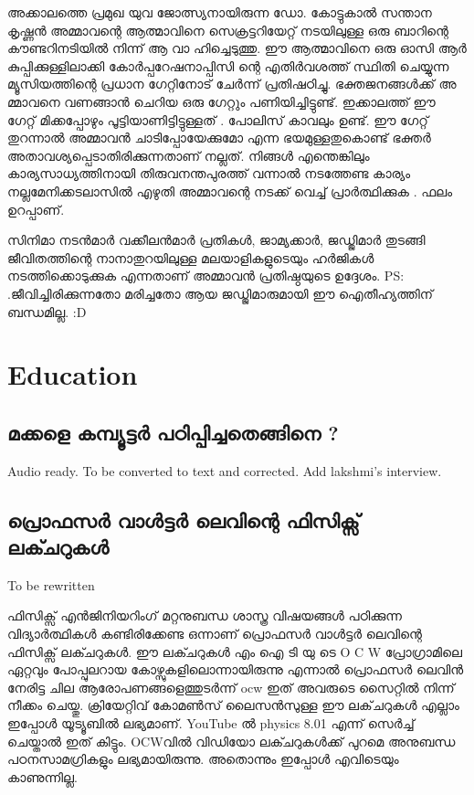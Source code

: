 \documentclass[10pt,a4paper]{report}
\begin{document}
  
   അക്കാലത്തെ പ്രമുഖ യുവ ജോത്സ്യനായിരുന്ന ഡോ. കോട്ടുകാൽ സന്താന കൃഷ്ണൻ അമ്മാവന്റെ ആത്മാവിനെ സെക്രട്ടറിയേറ്റ് നടയിലുള്ള ഒരു ബാറിന്റെ കൗണ്ടറിനടിയിൽ നിന്ന് ആ വാ ഹിച്ചെടുത്തു. ഈ ആത്മാവിനെ ഒരു ഓസി ആർ കുപ്പിക്കുള്ളിലാക്കി കോർപ്പറേഷനാപ്പിസി ന്റെ എതിർവശത്ത് സ്ഥിതി ചെയ്യുന്ന മ്യൂസിയത്തിന്റെ പ്രധാന ഗേറ്റിനോട് ചേർന്ന് പ്രതിഷഠിച്ചു. ഭക്തജനങ്ങൾക്ക് അ മ്മാവനെ വണങ്ങാൻ ചെറിയ ഒരു ഗേറ്റും പണിയിച്ചിട്ടുണ്ട്. ഇക്കാലത്ത് ഈ ഗേറ്റ് മിക്കപ്പോഴും പൂട്ടിയാണിട്ടിട്ടുള്ളത് . പോലിസ് കാവലും ഉണ്ട്. ഈ ഗേറ്റ് തുറന്നാൽ അമ്മാവൻ ചാടിപ്പോയേക്കുമോ എന്ന ഭയമുള്ളതുകൊണ്ട് ഭക്തർ അതാവശ്യപ്പെടാതിരിക്കുന്നതാണ് നല്ലത്. നിങ്ങൾ എന്തെങ്കിലും കാര്യസാധ്യത്തിനായി തിരുവനന്തപുരത്ത് വന്നാൽ നടത്തേണ്ട കാര്യം നല്ലമേനിക്കടലാസിൽ എഴുതി അമ്മാവന്റെ നടക്ക് വെച്ച് പ്രാർത്ഥിക്കുക . ഫലം ഉറപ്പാണ്.
   
    സിനിമാ നടൻമാർ വക്കീലൻമാർ പ്രതികൾ, ജാമ്യക്കാർ, ജഡ്ജിമാർ തുടങ്ങി ജീവിതത്തിന്റെ നാനാതുറയിലുള്ള മലയാളികളുടെയും ഹർജികൾ നടത്തിക്കൊടുക്കുക എന്നതാണ് അമ്മാവൻ പ്രതിഷ്ഠയുടെ ഉദ്ദേശം. PS: .ജീവിച്ചിരിക്കുന്നതോ മരിച്ചതോ ആയ ജഡ്ജിമാരുമായി ഈ ഐതീഹ്യത്തിന് ബന്ധമില്ല. :D
  
  
  \chapter{Education}
    \section{മക്കളെ കമ്പ്യൂട്ടർ പഠിപ്പിച്ചതെങ്ങിനെ ?}
        Audio ready. To be converted to text and corrected. Add lakshmi's interview.
        
    \section{പ്രൊഫസർ വാൾട്ടർ ലെവിന്റെ ഫിസിക്സ് ലക്ചറുകൾ}
    To be rewritten 
    
    ഫിസിക്സ് എൻജിനിയറിംഗ് മറ്റനുബന്ധ ശാസ്ത്ര വിഷയങ്ങൾ പഠിക്കുന്ന വിദ്യാർത്ഥികൾ കണ്ടിരിക്കേണ്ട ഒന്നാണ് പ്രൊഫസർ വാൾട്ടർ ലെവിന്റെ ഫിസിക്സ് ലക്ചറുകൾ. ഈ ലക്ചറുകൾ എം ഐ ടി യു ടെ O C W പ്രോഗ്രാമിലെ ഏറ്റവും പോപ്പുലറായ കോഴ്സുകളിലൊന്നായിരുന്നു എന്നാൽ പ്രൊഫസർ ലെവിൻ നേരിട്ട ചില ആരോപണങ്ങളെത്തുടർന്ന് ocw ഇത് അവരുടെ സൈറ്റിൽ നിന്ന് നീക്കം ചെയ്തു. ക്രിയേറ്റിവ് കോമൺസ് ലൈസൻസുള്ള ഈ ലക്‌ചറുകൾ എല്ലാം ഇപ്പോൾ യൂട്യൂബിൽ ലഭ്യമാണ്‌. YouTube ൽ physics 8.01 എന്ന് സെർച്ച് ചെയ്താൽ ഇത് കിട്ടും. OCWവിൽ വിഡിയോ ലക്ചറുകൾക്ക് പുറമെ അനുബന്ധ പഠനസാമഗ്രികളും ലഭ്യമായിരുന്നു. അതൊന്നും ഇപ്പോൾ എവിടെയും കാണുന്നില്ല. 
    
    
\end{document}
